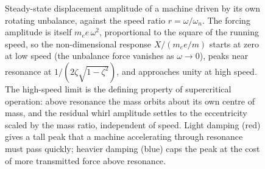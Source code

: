 \begin{figure}[htbp]
\centering
{}
\caption[Response to rotating unbalance]{Steady-state displacement
amplitude of a machine driven by its own rotating unbalance, against
the speed ratio $r=\omega/\omega_n$. The forcing amplitude is itself
$m_e e\,\omega^2$, proportional to the square of the running speed, so
the non-dimensional response $X/(m_e e/m)$ starts at zero at low speed
(the unbalance force vanishes as $\omega\to 0$), peaks near resonance
at $1/(2\zeta\sqrt{1-\zeta^2})$, and approaches unity at high speed.
The high-speed limit is the defining property of supercritical
operation: above resonance the mass orbits about its own centre of
mass, and the residual whirl amplitude settles to the eccentricity
scaled by the mass ratio, independent of speed. Light damping (red)
gives a tall peak that a machine accelerating through resonance must
pass quickly; heavier damping (blue) caps the peak at the cost of more
transmitted force above resonance.}
\label{fig:vol03ch06:rotating-unbalance}
\end{figure}
